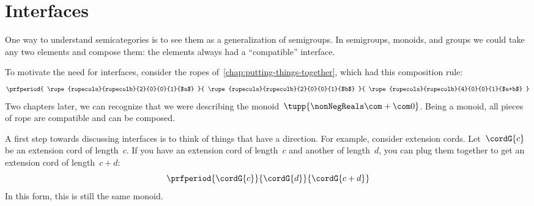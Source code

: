 
\section{Interfaces}\label{sec:interfaces}

One way to understand semicategories is to see them as a generalization of semigroups.
In semigroups, monoids, and groups we could take any two elements and compose them: the elements always had a ``compatible'' interface.

To motivate the need for interfaces, consider the ropes of~\cref{chap:putting-things-together}, which had this composition rule:
%
\begin{equation}
    \prfperiod{
        \rope{ropecola}{ropecolb}{2}{0}{0}{1}{$a$}
    }{
        \rope{ropecola}{ropecolb}{2}{0}{0}{1}{$b$}
    }{
        \rope{ropecola}{ropecolb}{4}{0}{0}{1}{$a+b$}
    }
\end{equation}
%
Two chapters later, we can recognize that we were describing the monoid~$\tupp{\nonNegReals \com + \com 0}$.
Being a monoid, all pieces of rope are compatible and can be composed.

A first step towards discussing interfaces is to think of things that have a direction.
For example, consider extension cords.
Let~$\cordG{c}$ be an extension cord of length~$c$.
If you have an extension cord of length~$c$ and another of length~$d$, you can plug them together to get an extension cord of length~$c+d$:
%
\begin{equation}
    \label{eq:cords}
    \prfperiod{
        \cordG{c}
    }{
        \cordG{d}
    }{
        \cordG{c+d}
    }
\end{equation}
%
In this form, this is still the same monoid.


